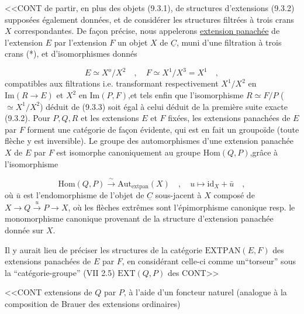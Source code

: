 
<<CONT de partir, en plus des objets (9.3.1), de structures d'extensions (9.3.2) supposées également données, et de considérer les structures filtrées à trois crans $X$ correspondantes. De façon précise, nous appelerons \underline{extension panachée} de l'extension $E$ par l'extension $F$ un objet $X$ de $\underline{C}$, muni d'une filtration à trois crans (*), et d'isomorphismes donnés

\begin{equation}\tag{9.3.3}
E \simeq X^o/X^2 \quad , \quad F \simeq X^1/X^3 = X^1 \quad ,
\end{equation}
compatibles aux filtrations i.e. transformant respectivement $X^1/X^2$ en $\mathrm{Im}(R \longrightarrow E)$ et $X^2$ en $\mathrm{Im}(P,F)$,et tels enfin que l'isomorphisme $R \simeq F/P$ ($\simeq X^1/X^2$) déduit de (9.3.3) soit égal à celui déduit de la première suite exacte (9.3.2). Pour $P,Q,R$ et les extensions $E$ et $F$ fixées, les extensions panachées de $E$ par $F$ forment une catégorie de façon évidente, qui est en fait un groupoïde (toute flèche y est inversible). Le groupe des automorphismes d'une extension panachée $X$ de $E$ par $F$ est isomorphe canoniquement au groupe $\mathrm{Hom}(Q,P)$,grâce à l'isomorphisme

\begin{equation}\tag{9.3.4}
\mathrm{Hom}(Q,P) \xrightarrow{\ \sim\ } \mathrm{Aut}_{\mathrm{extpan}}(X) \quad , \quad u \longmapsto \mathrm{id}_X + \bar{u} \quad ,
\end{equation}
où $\bar{u}$ est l'endomorphisme de l'objet de $\underline{C}$ sous-jacent à $X$ composé de $X \longrightarrow Q \xrightarrow{\ u\ } P \longrightarrow X$, où les flèches extrêmes sont l'épimorphisme canonique resp. le monomorphisme canonique provenant de la structure d'extension panachée donnée sur $X$.

Il y aurait lieu de préciser les structures de la catégorie $\mathrm{EXTPAN}(E,F)$ des extensions panachées de $E$ par $F$, en considérant celle-ci comme un``torseur'' sous la ``catégorie-groupe'' (VII 2.5) $\mathrm{EXT}(Q,P)$ des CONT>>



<<CONT extensions de $Q$ par $P$, à l'aide d'un foncteur naturel (analogue à la composition de Brauer des extensions ordinaires)

